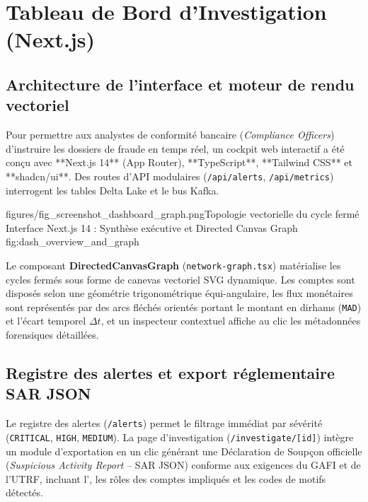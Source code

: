 
\chapter{Tableau de Bord d'Investigation (Next.js)}
\label{ch:dashboard}

\section{Architecture de l'interface et moteur de rendu vectoriel}

Pour permettre aux analystes de conformité bancaire (\textit{Compliance Officers}) d'instruire les dossiers de fraude en temps réel, un cockpit web interactif a été conçu avec **Next.js 14** (App Router), **TypeScript**, **Tailwind CSS** et **shadcn/ui**. Des routes d'API modulaires (\texttt{/api/alerts}, \texttt{/api/metrics}) interrogent les tables Delta Lake et le bus Kafka.

%
{figures/fig_screenshot_dashboard_graph.png}{Topologie vectorielle du cycle fermé}%
{Interface Next.js 14 : Synthèse exécutive et Directed Canvas Graph}%
{fig:dash_overview_and_graph}

Le composant \textbf{DirectedCanvasGraph} (\texttt{network-graph.tsx}) matérialise les cycles fermés sous forme de canevas vectoriel SVG dynamique. Les comptes sont disposés selon une géométrie trigonométrique équi-angulaire, les flux monétaires sont représentés par des arcs fléchés orientés portant le montant en dirhams (\texttt{MAD}) et l'écart temporel $\Delta t$, et un inspecteur contextuel affiche au clic les métadonnées forensiques détaillées.

\section{Registre des alertes et export réglementaire SAR JSON}

Le registre des alertes (\texttt{/alerts}) permet le filtrage immédiat par sévérité (\texttt{CRITICAL}, \texttt{HIGH}, \texttt{MEDIUM}). La page d'investigation (\texttt{/investigate/[id]}) intègre un module d'exportation en un clic générant une Déclaration de Soupçon officielle (\textit{Suspicious Activity Report} -- SAR JSON) conforme aux exigences du GAFI et de l'UTRF, incluant l'\alertID, les rôles des comptes impliqués et les codes de motifs détectés.

